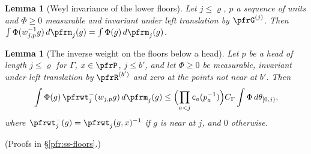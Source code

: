 \documentclass[10pt]{amsart}
\newtheorem{lemma}[theorem]{Lemma}
\theoremstyle{definition}
\theoremstyle{remark}
\begin{document}
\begin{lemma}[Weyl invariance of the lower floors]\label{pfr:weylinv}
Let $j\le\varrho$, $p$ a sequence of units and $\Phi\ge0$ measurable and invariant under left
translation by $\pfrG^{(j)}$. Then $\int\Phi(w_{j,p}^{-1}g)\,d\pfrm_j(g)=\int\Phi(g)\,d\pfrm_j(g)$.
\end{lemma}

\begin{lemma}[The inverse weight on the floors below a head]\label{pfr:invweight}
Let $p$ be a head of length $j\le\varrho$ for $\Gamma$, $x\in\pfrP$, $j\le b'$, and let $\Phi\ge0$ be
measurable, invariant under left translation by $\pfrR^{(b')}$ and zero at the points not near at $b'$.
Then
\[
\int\Phi(g)\,\pfrwt^{-}_j(w_{j,p}g)\,d\pfrm_j(g)\le\Bigl(\prod_{a<j}\mathsf c_a(p_a^{-1})\Bigr)C_\Gamma
\int\Phi\,d\theta_{[0,j)},
\]
where $\pfrwt^-_j(g)=\pfrwt_j(g,x)^{-1}$ if $g$ is near at $j$, and $0$ otherwise.
\end{lemma}
(Proofs in \S\ref{pfr:ss-floors}.)
\end{document}
